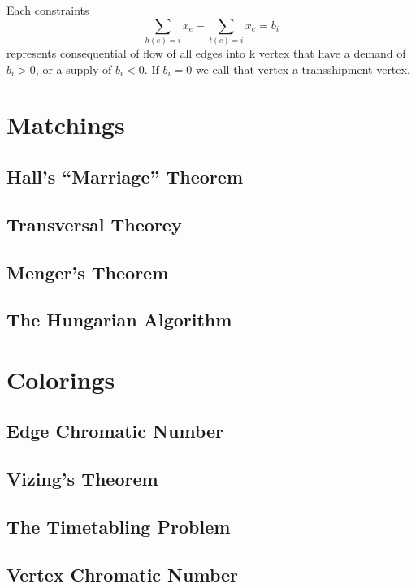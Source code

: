 			Each constraints
			\begin{equation}
				\sum_{h(e) = i} x_e - \sum_{t(e) = i}x_e = b_i
			\end{equation}
			represents consequential of flow of all edges into k vertex that have a demand of $b_i > 0$, or a supply of $b_i < 0$. If $b_i = 0$ we call that vertex a transshipment vertex.

	\chapter{Matchings}
		\section{Hall's ``Marriage'' Theorem}

		\section{Transversal Theorey}

		\section{Menger's Theorem}

		\section{The Hungarian Algorithm}

	\chapter{Colorings}
		\section{Edge Chromatic Number}

		\section{Vizing's Theorem}

		\section{The Timetabling Problem}

		\section{Vertex Chromatic Number}

